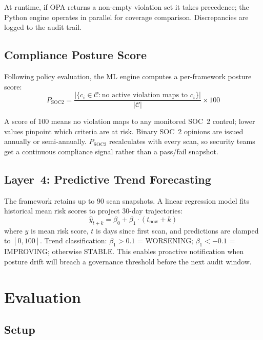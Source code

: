 \documentclass[journal]{IEEEtran}
\begin{document}
At runtime, if OPA returns a non-empty violation set it takes precedence; the Python engine operates in parallel for coverage comparison. Discrepancies are logged to the audit trail.

\subsection{Compliance Posture Score}

Following policy evaluation, the ML engine computes a per-framework posture score:
\begin{equation}
  P_{\mathrm{SOC2}} = \frac{\bigl|\{c_i \in \mathcal{C} : \text{no active violation maps to } c_i\}\bigr|}{|\mathcal{C}|} \times 100
  \label{eq:posture}
\end{equation}

A score of 100 means no violation maps to any monitored SOC~2 control; lower values pinpoint which criteria are at risk. Binary SOC~2 opinions are issued annually or semi-annually. $P_{\mathrm{SOC2}}$ recalculates with every scan, so security teams get a continuous compliance signal rather than a pass/fail snapshot.

\subsection{Layer~4: Predictive Trend Forecasting}

The framework retains up to 90 scan snapshots. A linear regression model fits historical mean risk scores to project 30-day trajectories:
\begin{equation}
  \hat{y}_{t+k} = \beta_0 + \beta_1 \cdot (t_{\mathrm{now}} + k)
  \label{eq:predict}
\end{equation}
where $y$ is mean risk score, $t$ is days since first scan, and predictions are clamped to $[0, 100]$. Trend classification: $\beta_1 > 0.1$ = WORSENING; $\beta_1 < -0.1$ = IMPROVING; otherwise STABLE. This enables proactive notification when posture drift will breach a governance threshold before the next audit window.

\section{Evaluation}
\label{sec:eval}

\subsection{Setup}
\end{document}
